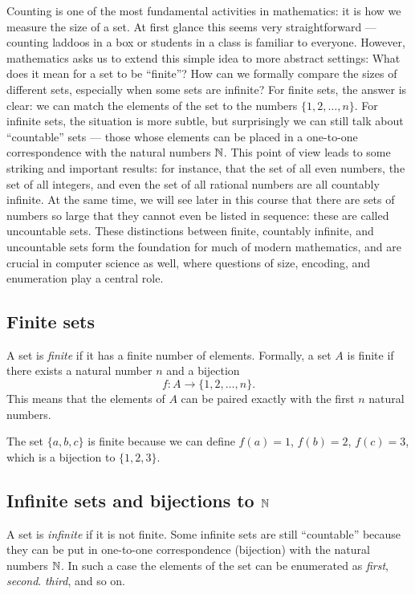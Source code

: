 Counting is one of the most fundamental activities in mathematics: it is how we measure the 
size of a set. At first glance this seems very straightforward — counting  laddoos in a box
or students in a class is familiar to everyone. However, mathematics asks us to extend this 
simple idea to more abstract settings: What does it mean for a set to be ``finite''? 
How can we formally compare the sizes of different sets, especially when some sets are 
infinite? For finite sets, the answer is clear: we can match the elements of the set 
to the numbers $\{1,2,\dots,n\}$. For infinite sets, the situation is more subtle, but 
surprisingly we can still talk about ``countable'' sets — those whose elements can be placed 
in a one-to-one correspondence with the natural numbers $\mathbb{N}$. This point of view leads to 
some striking and important results: for instance, that the set of all even numbers, the 
set of all integers, and even the set of all rational numbers are all countably infinite. 
At the same time,  we will see later in this course that there are sets of  numbers  so large that they cannot even be 
listed in sequence: these are called uncountable sets. These distinctions between finite, 
countably infinite, and uncountable sets form the foundation for much of modern mathematics, 
and are crucial in computer science as well, where questions of size, encoding, and 
enumeration play a central role.

\subsection{Finite sets}
A set is \emph{finite} if it has a finite number of elements.
Formally, a set $A$ is finite if there exists a natural number $n$ and a bijection
\[
f: A \to \{1,2,\dots,n\}.
\]
This means that the elements of $A$ can be paired exactly with the first $n$ natural numbers.

\begin{example}
The set $\{a,b,c\}$ is finite because we can define $f(a)=1$, $f(b)=2$, $f(c)=3$,
which is a bijection to $\{1,2,3\}$.
\end{example}

\subsection{Infinite sets and bijections to $\mathbb{N}$}
A set is \emph{infinite} if it is not finite. Some infinite sets are still ``countable''
because they can be put in one-to-one correspondence (bijection) with the natural numbers $\mathbb{N}$.  In such a case the elements of the set can be enumerated as {\em first}, {\em second}. {\em third}, and so on.

